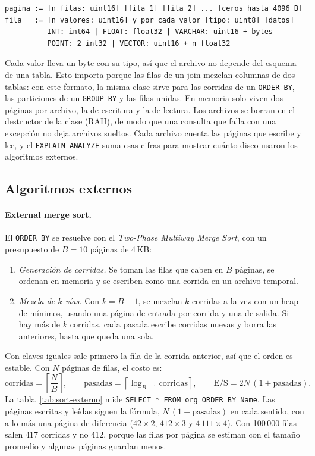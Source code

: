 \documentclass[11pt,a4paper]{article}
\begin{document}
\begin{lstlisting}
pagina := [n filas: uint16] [fila 1] [fila 2] ... [ceros hasta 4096 B]
fila   := [n valores: uint16] y por cada valor [tipo: uint8] [datos]
          INT: int64 | FLOAT: float32 | VARCHAR: uint16 + bytes
          POINT: 2 int32 | VECTOR: uint16 + n float32
\end{lstlisting}

Cada valor lleva un byte con su tipo, así que el archivo no depende del esquema de una tabla. Esto importa porque las filas de un join mezclan columnas de dos tablas: con este formato, la misma clase sirve para las corridas de un \texttt{ORDER BY}, las particiones de un \texttt{GROUP BY} y las filas unidas. En memoria solo viven dos páginas por archivo, la de escritura y la de lectura. Los archivos se borran en el destructor de la clase (RAII), de modo que una consulta que falla con una excepción no deja archivos sueltos. Cada archivo cuenta las páginas que escribe y lee, y el \texttt{EXPLAIN ANALYZE} suma esas cifras para mostrar cuánto disco usaron los algoritmos externos.

\subsection{Algoritmos externos}

\paragraph{External merge sort.} El \texttt{ORDER BY} se resuelve con el \emph{Two-Phase Multiway Merge Sort}, con un presupuesto de $B = 10$ páginas de 4\,KB:

\begin{enumerate}
  \item \emph{Generación de corridas.} Se toman las filas que caben en $B$ páginas, se ordenan en memoria y se escriben como una corrida en un archivo temporal.
  \item \emph{Mezcla de $k$ vías.} Con $k = B - 1$, se mezclan $k$ corridas a la vez con un heap de mínimos, usando una página de entrada por corrida y una de salida. Si hay más de $k$ corridas, cada pasada escribe corridas nuevas y borra las anteriores, hasta que queda una sola.
\end{enumerate}

Con claves iguales sale primero la fila de la corrida anterior, así que el orden es estable. Con $N$ páginas de filas, el costo es:
\[
  \text{corridas} = \left\lceil \frac{N}{B} \right\rceil, \qquad
  \text{pasadas} = \left\lceil \log_{B-1} \text{corridas} \right\rceil, \qquad
  \text{E/S} = 2N\,(1 + \text{pasadas}).
\]
La tabla~\ref{tab:sort-externo} mide \texttt{SELECT * FROM org ORDER BY Name}. Las páginas escritas y leídas siguen la fórmula, $N\,(1 + \text{pasadas})$ en cada sentido, con a lo más una página de diferencia ($42 \times 2$, $412 \times 3$ y $4\,111 \times 4$). Con 100\,000 filas salen 417 corridas y no 412, porque las filas por página se estiman con el tamaño promedio y algunas páginas guardan menos.
\end{document}

